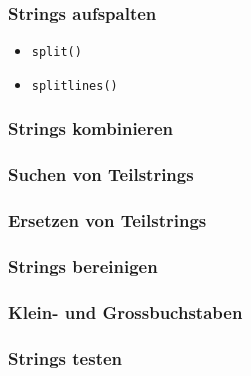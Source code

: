 	

\subsubsection{Strings aufspalten}
\begin{itemize}
	\item \texttt{split()}
	
	\item \texttt{splitlines()}
	
\end{itemize}

\subsubsection{Strings kombinieren}


\subsubsection{Suchen von Teilstrings}


\subsubsection{Ersetzen von Teilstrings}


\subsubsection{Strings bereinigen}


\subsubsection{Klein- und Grossbuchstaben}


\subsubsection{Strings testen}

